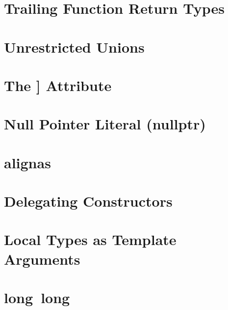\newpage
\section[Trailing Function Return Types]{Trailing Function Return Types}\label{trailing-function-return-types}


\newpage
\section[Unrestricted Unions]{Unrestricted Unions}\label{unrestricted-unions}


\newpage
\section[The {\tt [[noreturn]]} Attribute]{The {\SecCode [[noreturn]]} Attribute}\label{the-noreturn-attribute}


\newpage
\section[Null Pointer Literal (\tt{nullptr})]{Null Pointer Literal ({\SecCode nullptr})}\label{null-pointer-literal-(nullptr)}


\newpage
\section[\tt{alignas}]{{\SecCode alignas}}\label{alignas}


\newpage
\section[Delegating Constructors]{Delegating Constructors}\label{delegating-constructors}


\newpage
\section[Local Types as Template Arguments]{Local Types as Template Arguments}\label{local-types-as-template-arguments}


\newpage
\section[{\tt long}~{\tt long}]{{\SecCode long}~{\SecCode long}}\label{long-long}


